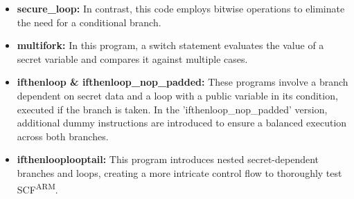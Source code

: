 \begin{itemize}
    \item \textbf{secure\_loop:} In contrast, this code employs bitwise operations to eliminate the need for a conditional branch.
    
    \item \textbf{multifork:} In this program, a switch statement evaluates the value of a secret variable and compares it against multiple cases. 
    
    \item \textbf{ifthenloop \& ifthenloop\_nop\_padded:} These programs involve a branch dependent on secret data and a loop with a public variable in its condition, executed if the branch is taken. In the 'ifthenloop\_nop\_padded' version, additional dummy instructions are introduced to ensure a balanced execution across both branches.  
    
    \item \textbf{ifthenlooplooptail:} This program introduces nested secret-dependent branches and loops, creating a more intricate control flow to thoroughly test \gls{SCF}\textsuperscript{ARM}.

\end{itemize}



